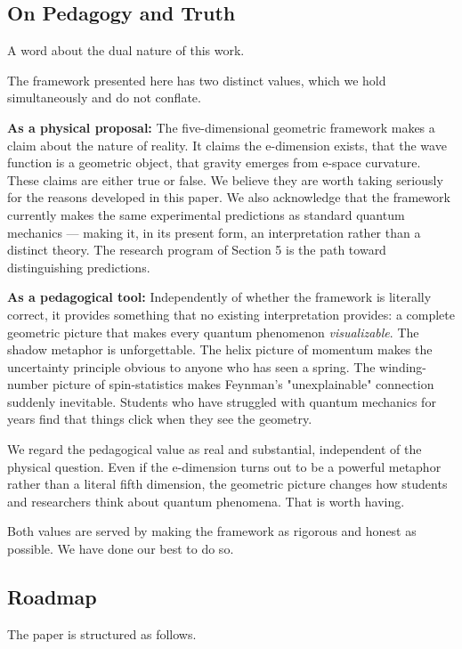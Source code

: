 \documentclass[aps,prd,preprint,superscriptaddress,longbibliography,floatfix]{revtex4-2}
\theoremstyle{remark}
\begin{document}
\subsection{On Pedagogy and Truth}

A word about the dual nature of this work.

The framework presented here has two distinct values, which we hold simultaneously and do not conflate.

\textbf{As a physical proposal:} The five-dimensional geometric framework makes a claim about the nature of reality. It claims the e-dimension exists, that the wave function is a geometric object, that gravity emerges from e-space curvature. These claims are either true or false. We believe they are worth taking seriously for the reasons developed in this paper. We also acknowledge that the framework currently makes the same experimental predictions as standard quantum mechanics --- making it, in its present form, an interpretation rather than a distinct theory. The research program of Section 5 is the path toward distinguishing predictions.

\textbf{As a pedagogical tool:} Independently of whether the framework is literally correct, it provides something that no existing interpretation provides: a complete geometric picture that makes every quantum phenomenon \textit{visualizable}. The shadow metaphor is unforgettable. The helix picture of momentum makes the uncertainty principle obvious to anyone who has seen a spring. The winding-number picture of spin-statistics makes Feynman's "unexplainable" connection suddenly inevitable. Students who have struggled with quantum mechanics for years find that things click when they see the geometry.

We regard the pedagogical value as real and substantial, independent of the physical question. Even if the e-dimension turns out to be a powerful metaphor rather than a literal fifth dimension, the geometric picture changes how students and researchers think about quantum phenomena. That is worth having.

Both values are served by making the framework as rigorous and honest as possible. We have done our best to do so.



\subsection{Roadmap}

The paper is structured as follows.
\end{document}
